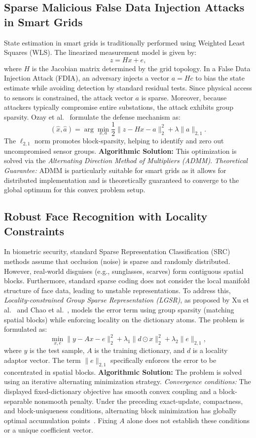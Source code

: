 \documentclass[12pt]{article}
\begin{document}
\subsection{Sparse Malicious False Data Injection Attacks in Smart Grids}

State estimation in smart grids is traditionally performed using Weighted Least Squares (WLS). The linearized measurement model is given by:
\[
    z = Hx + e,
\]
where $H$ is the Jacobian matrix determined by the grid topology. In a False Data Injection Attack (FDIA), an adversary injects a vector $a = Hc$ to bias the state estimate while avoiding detection by standard residual tests.
Since physical access to sensors is constrained, the attack vector $a$ is sparse. Moreover, because attackers typically compromise entire substations, the attack exhibits group sparsity. Ozay et al.~\cite{Ozay} formulate the defense mechanism as:
\[
    (\hat{x}, \hat{a}) = \arg\min_{x, a} \frac{1}{2} \|z - Hx - a\|_2^2 + \lambda \|a\|_{2,1}.
\]
The $\ell_{2,1}$ norm promotes block-sparsity, helping to identify and zero out uncompromised sensor groups.
\textbf{Algorithmic Solution:} This optimization is solved via the \textit{Alternating Direction Method of Multipliers (ADMM)}.
\textit{Theoretical Guarantee:} ADMM is particularly suitable for smart grids as it allows for distributed implementation and is theoretically guaranteed to converge to the global optimum for this convex problem setup.

\subsection{Robust Face Recognition with Locality Constraints}

In biometric security, standard Sparse Representation Classification (SRC) methods assume that occlusion (noise) is sparse and randomly distributed. However, real-world disguises (e.g., sunglasses, scarves) form contiguous spatial blocks. Furthermore, standard sparse coding does not consider the local manifold structure of face data, leading to unstable representations.
To address this, \textit{Locality-constrained Group Sparse Representation (LGSR)}, as proposed by Xu et al.~\cite{XuLGSR} and Chao et al.~\cite{ChaoLGSR}, models the error term using group sparsity (matching spatial blocks) while enforcing locality on the dictionary atoms. The problem is formulated as:
\[
    \min_{x, e} \|y - Ax - e\|_2^2 + \lambda_1 \|d \odot x\|_2^2 + \lambda_2 \|e\|_{2,1},
\]
where $y$ is the test sample, $A$ is the training dictionary, and $d$ is a locality adaptor vector. The term $\|e\|_{2,1}$ specifically enforces the error to be concentrated in spatial blocks.
\textbf{Algorithmic Solution:} The problem is solved using an iterative alternating minimization strategy.
\textit{Convergence conditions:} The displayed fixed-dictionary objective has smooth convex coupling and a block-separable nonsmooth penalty. Under the preceding exact-update, compactness, and block-uniqueness conditions, alternating block minimization has globally optimal accumulation points~\cite{Tseng2001}. Fixing $A$ alone does not establish these conditions or a unique coefficient vector.
\end{document}
